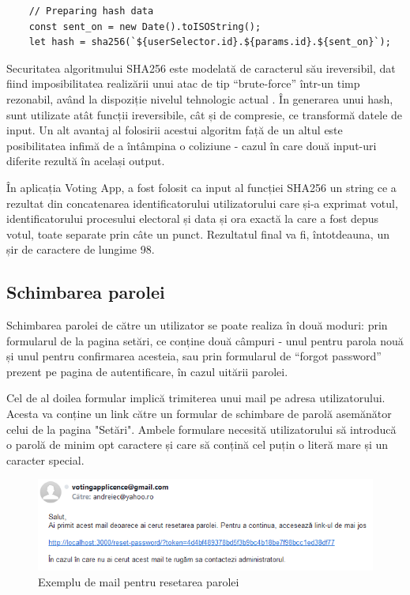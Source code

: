 \begin{code}
\begin{verbatim}
    // Preparing hash data
    const sent_on = new Date().toISOString();
    let hash = sha256(`${userSelector.id}.${params.id}.${sent_on}`);
\end{verbatim}
\label{code:hash-code}
\end{code}
\hfill

Securitatea algoritmului SHA256 este modelată de caracterul său ireversibil, dat fiind imposibilitatea realizării unui atac de tip \enquote{brute-force} într-un timp rezonabil, având la dispoziție nivelul tehnologic actual \cite{how_secure_sha}. În generarea unui hash, sunt utilizate atât funcții ireversibile, cât și de compresie, ce transformă datele de input. Un alt avantaj al folosirii acestui algoritm față de un altul este posibilitatea infimă de a întâmpina o coliziune - cazul în care două input-uri diferite rezultă în același output.

În aplicația Voting App, a fost folosit ca input al funcției SHA256 un string ce a rezultat din concatenarea identificatorului utilizatorului care și-a exprimat votul, identificatorului procesului electoral și data și ora exactă la care a fost depus votul, toate separate prin câte un punct. Rezultatul final va fi, întotdeauna, un șir de caractere de lungime 98.

\subsection{Schimbarea parolei}

Schimbarea parolei de către un utilizator se poate realiza în două moduri: prin formularul de la pagina setări, ce conține două câmpuri - unul pentru parola nouă și unul pentru confirmarea acesteia, sau prin formularul de \enquote{forgot password} prezent pe pagina de autentificare, în cazul uitării parolei.

Cel de al doilea formular implică trimiterea unui mail pe adresa utilizatorului. Acesta va conține un link către un formular de schimbare de parolă asemănător celui de la pagina "Setări". Ambele formulare necesită utilizatorului să introducă o parolă de minim opt caractere și care să conțină cel puțin o literă mare și un caracter special.

\begin{figure}[!ht]
    \centering
    \includegraphics[width=135mm]{images/reset_pass_mail.png}
    \caption{Exemplu de mail pentru resetarea parolei}
\end{figure}

